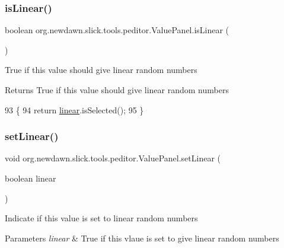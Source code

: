 \subsubsection{\texorpdfstring{is\+Linear()}{isLinear()}}
{\footnotesize\ttfamily boolean org.\+newdawn.\+slick.\+tools.\+peditor.\+Value\+Panel.\+is\+Linear (\begin{DoxyParamCaption}{ }\end{DoxyParamCaption})\hspace{0.3cm}{\ttfamily [inline]}}

True if this value should give linear random numbers

\begin{DoxyReturn}{Returns}
True if this value should give linear random numbers 
\end{DoxyReturn}

\begin{DoxyCode}
93                               \{
94         \textcolor{keywordflow}{return} \mbox{\hyperlink{classorg_1_1newdawn_1_1slick_1_1tools_1_1peditor_1_1_value_panel_accd8a5d5872a9fe38b1e546944982dfd}{linear}}.isSelected();
95     \}
\end{DoxyCode}
\mbox{\label{classorg_1_1newdawn_1_1slick_1_1tools_1_1peditor_1_1_value_panel_a3bed734dc87c5562ffc73169bfdfa35e}} 
\subsubsection{\texorpdfstring{set\+Linear()}{setLinear()}}
{\footnotesize\ttfamily void org.\+newdawn.\+slick.\+tools.\+peditor.\+Value\+Panel.\+set\+Linear (\begin{DoxyParamCaption}\item[{boolean}]{linear }\end{DoxyParamCaption})\hspace{0.3cm}{\ttfamily [inline]}}

Indicate if this value is set to linear random numbers


\begin{DoxyParams}{Parameters}
{\em linear} & True if this vlaue is set to give linear random numbers \\
\hline
\end{DoxyParams}

